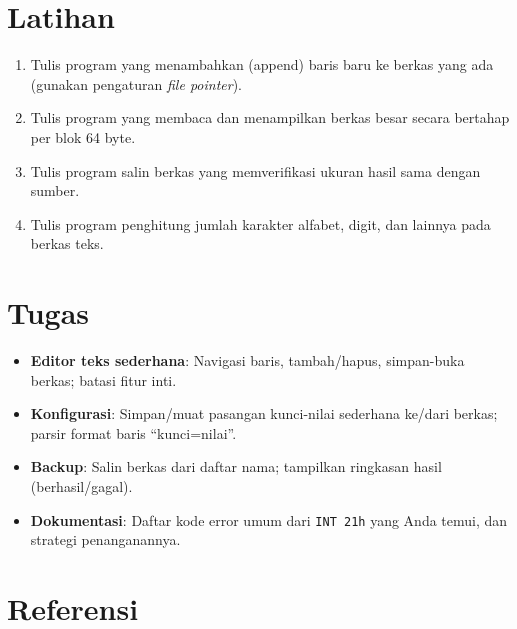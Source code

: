 \section{Latihan}
\begin{enumerate}
  \item Tulis program yang menambahkan (append) baris baru ke berkas yang ada (gunakan pengaturan \textit{file pointer}).
  \item Tulis program yang membaca dan menampilkan berkas besar secara bertahap per blok 64 byte.
  \item Tulis program salin berkas yang memverifikasi ukuran hasil sama dengan sumber.
  \item Tulis program penghitung jumlah karakter alfabet, digit, dan lainnya pada berkas teks.
\end{enumerate}

\section{Tugas}
\begin{itemize}
  \item \textbf{Editor teks sederhana}: Navigasi baris, tambah/hapus, simpan-buka berkas; batasi fitur inti.
  \item \textbf{Konfigurasi}: Simpan/muat pasangan kunci-nilai sederhana ke/dari berkas; parsir format baris ``kunci=nilai''.
  \item \textbf{Backup}: Salin berkas dari daftar nama; tampilkan ringkasan hasil (berhasil/gagal).
  \item \textbf{Dokumentasi}: Daftar kode error umum dari \texttt{INT 21h} yang Anda temui, dan strategi penanganannya.
\end{itemize}

\section{Referensi}
